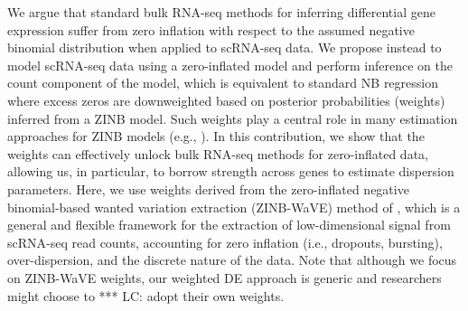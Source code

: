\documentclass{bmcart}
\newcommand{\lc}[1]{\textcolor{ao}{*** LC: #1}}
\begin{document}

We argue that standard bulk RNA-seq methods for inferring differential gene expression suffer from zero inflation with respect to the assumed negative binomial distribution when applied to scRNA-seq data. We propose instead to model scRNA-seq data using a zero-inflated model and perform inference on the count component of the model, which is equivalent to standard NB regression where excess zeros are downweighted based on posterior probabilities (weights) inferred from a ZINB model. Such weights play a central role in many estimation approaches for ZINB models  (e.g., \citep{Cameron2013}). In this contribution, we show that the weights can effectively unlock bulk RNA-seq methods for zero-inflated data, allowing us, in particular, to borrow strength across genes to estimate dispersion parameters. Here, we use weights derived from the zero-inflated negative binomial-based wanted variation extraction (ZINB-WaVE) method of \citet{Risso2017}, which is a general and flexible framework for the extraction of low-dimensional signal from scRNA-seq read counts, accounting for zero inflation (i.e., dropouts, bursting), over-dispersion, and the discrete nature of the data. Note that although we focus on ZINB-WaVE weights, our weighted DE approach is generic and researchers might choose to \lc{adopt} their own weights. %
\end{document}
